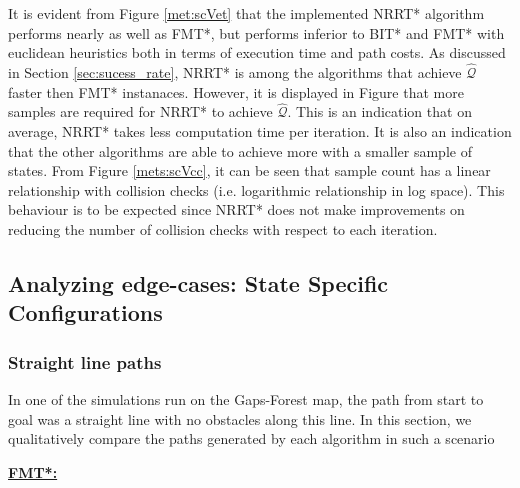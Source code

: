 \documentclass{article}
\newcommand*{\varfont}{\fontfamily{pcr}\selectfont}
\begin{document}
It is evident from Figure \ref{met:scVet} that the implemented NRRT* algorithm performs nearly as well as FMT*, but performs inferior to BIT* and FMT* with euclidean heuristics both in terms of execution time and path costs. As discussed in Section \ref{sec:sucess_rate}, NRRT* is among the algorithms that achieve $\hat{\mathcal{Q}}$ faster then FMT* instanaces. However, it is displayed in Figure \label{met:srVet} that more samples are required for NRRT* to achieve $\hat{\mathcal{Q}}$. This is an indication that on average, NRRT* takes less computation time per iteration. It is also an indication that the other algorithms are able to achieve more with a smaller sample of states. From Figure \ref{mets:scVcc}, it can be seen that sample count has a linear relationship with collision checks (i.e. logarithmic relationship in log space). This behaviour is to be expected since NRRT* does not make improvements on reducing the number of collision checks with respect to each iteration. 

\subsection{Analyzing edge-cases: State Specific Configurations}

\subsubsection{Straight line paths}
\label{sec:straight_line}
In one of the simulations run on the Gaps-Forest map, the path from {\varfont start} to {\varfont goal} was a straight line with no obstacles along this line. In this section, we qualitatively compare the paths generated by each algorithm in such a scenario
\pagebreak

\textbf{\underline{FMT*:}}
\end{document}

